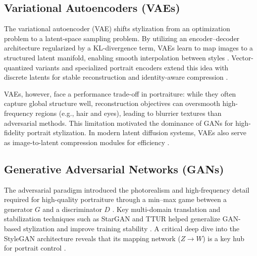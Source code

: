 \documentclass[journal]{IEEEtran}
\begin{document}
\subsection{Variational Autoencoders (VAEs)}
\label{sec:theory:vae}
The variational autoencoder (VAE) shifts stylization from an optimization problem to a latent-space sampling problem. By utilizing an encoder--decoder architecture regularized by a KL-divergence term, VAEs learn to map images to a structured latent manifold, enabling smooth interpolation between styles \cite{kingma2013auto}. Vector-quantized variants and specialized portrait encoders extend this idea with discrete latents for stable reconstruction and identity-aware compression \cite{esser2021vqgan,zhang2023ssrencoderes}.

VAEs, however, face a performance trade-off in portraiture: while they often capture global structure well, reconstruction objectives can oversmooth high-frequency regions (e.g., hair and eyes), leading to blurrier textures than adversarial methods. This limitation motivated the dominance of GANs for high-fidelity portrait stylization. In modern latent diffusion systems, VAEs also serve as image-to-latent compression modules for efficiency \cite{rombach_2022_cvpr}.

\subsection{Generative Adversarial Networks (GANs)}
\label{sec:theory:gan}
The adversarial paradigm introduced the photorealism and high-frequency detail required for high-quality portraiture through a min--max game between a generator $G$ and a discriminator $D$ \cite{goodfellow2014generative}. Key multi-domain translation and stabilization techniques such as StarGAN and TTUR helped generalize GAN-based stylization and improve training stability \cite{choi2018stargan,heusel2017ttur}. A critical deep dive into the StyleGAN architecture reveals that its mapping network ($Z \to W$) is a key hub for portrait control \cite{karras2019style}.
\end{document}
